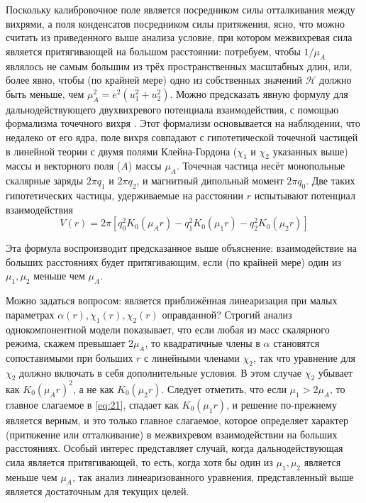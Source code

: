 Поскольку калибровочное поле является посредником силы отталкивания между 
вихрями, а поля конденсатов посредником силы притяжения, ясно, что можно 
считать из приведенного выше анализа условие, при котором межвихревая сила 
является притягивающей на большом расстоянии: потребуем, чтобы \( 1/\mu_A \) 
являлось не самым большим из трёх пространственных масштабных длин, или, 
более явно, чтобы (по крайней мере) одно из собственных значений 
\( \mathcal{H} \) должно быть меньше, чем \( \mu_A^2 = e^2(u_1^2 + u_2^2) \). 
Можно предсказать явную формулу для дальнодействующего двухвихревого 
потенциала взаимодействия, с помощью формализма точечного вихря \cite{bib:19}. 
Этот формализм основывается на наблюдении, что недалеко от его ядра, поле 
вихря совпадают с гипотетической точечной частицей в линейной теории с двумя 
полями Клейна-Гордона (\( \chi_1 \) и \( \chi_2 \) указанных выше) массы и 
векторного поля (\( A \)) массы \( \mu_A \). Точечная частица несёт 
монопольные скалярные заряды \( 2\pi q_1 \) и \( 2\pi q_2 \), и магнитный 
дипольный момент \( 2\pi q_0 \). Две таких гипотетических частицы, 
удерживаемые на расстоянии \( r \) испытывают потенциал взаимодействия
\begin{equation}
    V(r) = 2\pi\left[ q_0^2 K_0(\mu_A r) - q_1^2 K_0(\mu_1 r) - 
        q_2^2 K_0(\mu_2 r) \right]
    \label{eq:22}
\end{equation}

Эта формула воспроизводит предсказанное выше объяснение: взаимодействие на 
больших расстояниях будет притягивающим, если (по крайней мере) один из 
\( \mu_1, \mu_2 \) меньше чем \( \mu_A \). 

Можно задаться вопросом: является приближённая линеаризация при малых 
параметрах \( \alpha(r), \chi_1(r), \chi_2(r) \) оправданной? Строгий анализ 
однокомпонентной модели \cite{bib:20} показывает, что если любая из масс 
скалярного режима, скажем превышает \( 2\mu_A \), то квадратичные члены в 
\( \alpha \) становятся сопоставимыми при больших \( r \) с линейными членами 
\( \chi_2 \), так что уравнение для \( \chi_2 \) должно включать в себя 
дополнительные условия. В этом случае \( \chi_2 \) убывает как 
\( K_0(\mu_A r)^2 \), а не как \( K_0(\mu_2 r) \). Следует отметить, что если 
\( \mu_1 > 2\mu_A \), то главное слагаемое в \eqref{eq:21}, спадает как 
\( K_0(\mu_1 r) \), и решение по-прежнему является верным, и это только 
главное слагаемое, которое определяет характер (притяжение или отталкивание) в 
межвихревом взаимодействии на больших расстояниях. Особый интерес представляет 
случай, когда дальнодействующая сила является притягивающей, то есть, когда 
хотя бы один из \( \mu_1, \mu_2 \) является меньше чем \( \mu_A \), так 
анализ линеаризованного уравнения, представленный выше является достаточным 
для текущих целей. \cite{bib:main}

